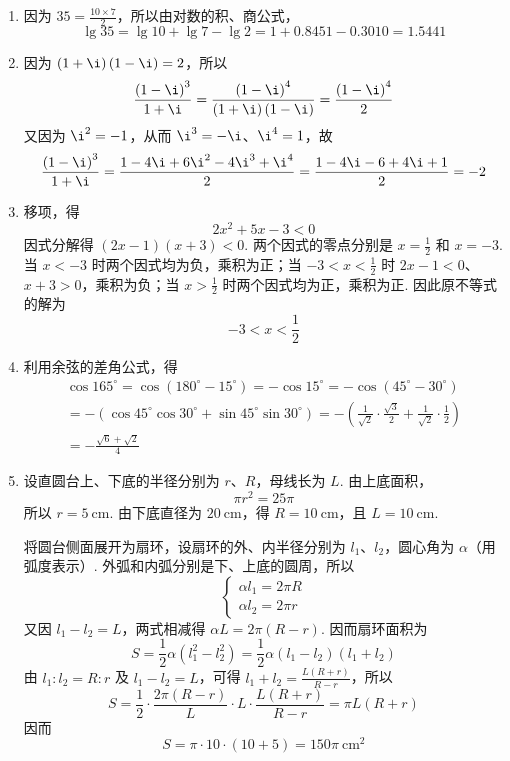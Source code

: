 \begin{solution}
\begin{enumerate}
\item 因为 \(35=\frac{10\times 7}{2}\)，所以由对数的积、商公式，
\[
\lg 35=\lg 10+\lg 7-\lg 2=1+0.8451-0.3010=1.5441
\]

\item 因为 \(\left(1+\i\right)\left(1-\i\right)=2\)，所以
\[
\frac{\left(1-\i\right)^3}{1+\i}=\frac{\left(1-\i\right)^4}{\left(1+\i\right)\left(1-\i\right)}=\frac{\left(1-\i\right)^4}{2}
\]
又因为 \(\i^2=-1\)，从而 \(\i^3=-\i\)、\(\i^4=1\)，故
\[
\frac{\left(1-\i\right)^3}{1+\i}=\frac{1-4\i+6\i^2-4\i^3+\i^4}{2}=\frac{1-4\i-6+4\i+1}{2}=-2
\]

\item 移项，得
\[
2x^2+5x-3<0
\]
因式分解得 \(\left(2x-1\right)\left(x+3\right)<0\). 两个因式的零点分别是 \(x=\frac12\) 和 \(x=-3\). 当 \(x<-3\) 时两个因式均为负，乘积为正；当 \(-3<x<\frac12\) 时 \(2x-1<0\)、\(x+3>0\)，乘积为负；当 \(x>\frac12\) 时两个因式均为正，乘积为正. 因此原不等式的解为
\[
-3<x<\frac12
\]

\item 利用余弦的差角公式，得
\[
\begin{gathered}
\cos 165^\circ=\cos\left(180^\circ-15^\circ\right)=-\cos15^\circ=-\cos\left(45^\circ-30^\circ\right)\\
=-\left(\cos45^\circ\cos30^\circ+\sin45^\circ\sin30^\circ\right)=-\left(\frac{1}{\sqrt2}\cdot\frac{\sqrt3}{2}+\frac{1}{\sqrt2}\cdot\frac12\right)\\
=-\frac{\sqrt6+\sqrt2}{4}
\end{gathered}
\]

\item 设直圆台上、下底的半径分别为 \(r\)、\(R\)，母线长为 \(L\). 由上底面积，
\[
\pi r^2=25\pi
\]
所以 \(r=5\mathrm{~cm}\). 由下底直径为 \(20\mathrm{~cm}\)，得 \(R=10\mathrm{~cm}\)，且 \(L=10\mathrm{~cm}\).

将圆台侧面展开为扇环，设扇环的外、内半径分别为 \(l_1\)、\(l_2\)，圆心角为 \(\alpha\)（用弧度表示）. 外弧和内弧分别是下、上底的圆周，所以
\[
\begin{cases}
\alpha l_1=2\pi R\\
\alpha l_2=2\pi r
\end{cases}
\]
又因 \(l_1-l_2=L\)，两式相减得 \(\alpha L=2\pi\left(R-r\right)\). 因而扇环面积为
\[
S=\frac12\alpha\left(l_1^2-l_2^2\right)=\frac12\alpha\left(l_1-l_2\right)\left(l_1+l_2\right)
\]
由 \(l_1:l_2=R:r\) 及 \(l_1-l_2=L\)，可得 \(l_1+l_2=\frac{L\left(R+r\right)}{R-r}\)，所以
\[
S=\frac12\cdot\frac{2\pi\left(R-r\right)}{L}\cdot L\cdot\frac{L\left(R+r\right)}{R-r}=\pi L\left(R+r\right)
\]
因而
\[
S=\pi\cdot10\cdot\left(10+5\right)=150\pi\mathrm{~cm}^2
\]


\end{enumerate}
\end{solution}
